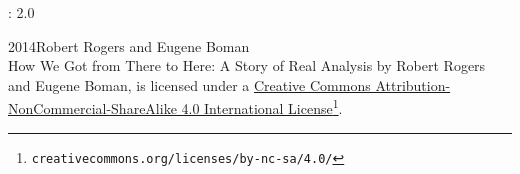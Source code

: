 \thispagestyle{empty}
\hypertarget{x:colophon:FrontColophon}{}
: 2.0\par\medskip
\noindent\textcopyright{}2014\quad{}Robert Rogers and Eugene Boman\\[0.5\baselineskip]
How We Got from There to Here: A Story of Real Analysis by Robert Rogers and Eugene Boman, is licensed under a \href{http://creativecommons.org/licenses/by-nc-sa/4.0/}{Creative Commons Attribution-NonCommercial-ShareAlike 4.0 International License}\footnote{\nolinkurl{creativecommons.org/licenses/by-nc-sa/4.0/}\label{g:fn:idp1}}.\par\medskip
{}
\null\clearpage